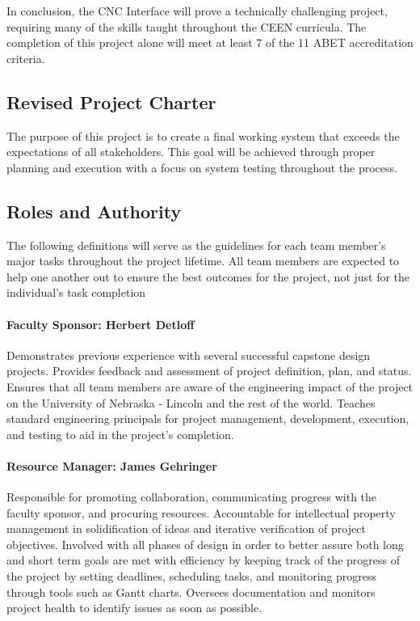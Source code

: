 In conclusion, the CNC Interface will prove a technically challenging project, requiring many of the skills taught throughout the CEEN curricula.
The completion of this project alone will meet at least 7 of the 11 ABET accreditation criteria.

\subsection{Revised Project Charter}
The purpose of this project is to create a final working system that exceeds the expectations of all stakeholders. This goal will be achieved through proper planning and execution with a focus on system testing throughout the process.

\subsection{Roles and Authority}
The following definitions will serve as the guidelines for each team member's major tasks throughout the project lifetime. All team members are expected to help one another out to ensure the best outcomes for the project, not just for the individual's task completion
\paragraph{Faculty Sponsor: Herbert Detloff}
Demonstrates previous experience with several successful capstone design projects.
Provides feedback and assessment of project definition, plan, and status.
Ensures that all team members are aware of the engineering impact of the project on the University of Nebraska - Lincoln and the rest of the world.
Teaches standard engineering principals for project management, development, execution, and testing to aid in the project's completion.

\paragraph{Resource Manager: James Gehringer}
Responsible for promoting collaboration, communicating progress with the faculty sponsor, and procuring resources.
Accountable for intellectual property management in solidification of ideas and iterative verification of project objectives.
Involved with all phases of design in order to better assure both long and short term goals are met with efficiency by keeping track of the progress of the project by setting deadlines, scheduling tasks, and monitoring progress through tools such as Gantt charts.
Oversees documentation and monitors project health to identify issues as soon as possible.

